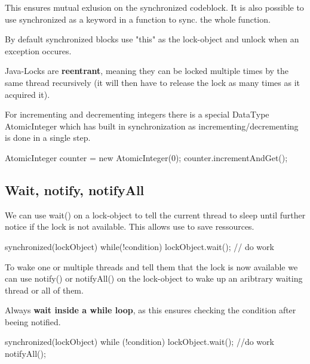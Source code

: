 This ensures mutual exlusion on the synchronized codeblock. It is also possible to use synchronized as a
keyword in a function to sync. the whole function.

\begin{remark}
    By default synchronized blocks use "this" as the lock-object and unlock when an exception occures.
\end{remark}

\begin{remark}
    Java-Locks are \textbf{reentrant}, meaning they can be locked multiple times by the same thread recursively (it
    will then have to release the lock as many times as it acquired it).
\end{remark}

For incrementing and decrementing integers there is a special DataType AtomicInteger which has built in
synchronization as incrementing/decrementing is done in a single step.

\begin{codeexample}
AtomicInteger counter = new AtomicInteger(0);
counter.incrementAndGet();
\end{codeexample}

\subsection{Wait, notify, notifyAll}

We can use wait() on a lock-object to tell the current thread to sleep until further notice if the lock is
not available. This allows use to save ressources.

\begin{codeexample}
synchronized(lockObject) {
    while(!condition) {
        lockObject.wait();
    }
    // do work  
}
\end{codeexample}

To wake one or multiple threads and tell them that the lock is now available we can use notify() or
notifyAll() on the lock-object to wake up an aribtrary waiting thread or all of them.

\begin{important}
    Always \textbf{wait inside a while loop}, as this ensures checking the condition after beeing notified.
\end{important}

\begin{codeexample}
synchronized(lockObject) {
    while (!condition) {
        lockObject.wait();
    }
    //do work
    notifyAll();
}       
\end{codeexample}

